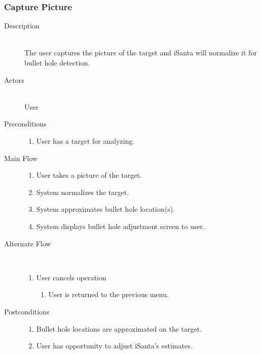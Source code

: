 \subsubsection{Capture Picture}
\begin{description}
    \item[Description] \hfill \\
        The user captures the picture of the target and iSanta will normalize it for bullet hole detection.
    \item[Actors] \hfill \\
        User
    \item[Preconditions] \hfill 
        \begin{enumerate}
            \item User has a target for analyzing.
        \end{enumerate}
    \item[Main Flow] \hfill 
        \begin{enumerate}
            \item User takes a picture of the target.
            \item System normalizes the target.
            \item System approximates bullet hole location(s).
            \item System displays bullet hole adjustment screen to user.
        \end{enumerate}
    \item[Alternate Flow] \hfill \\
        \begin{enumerate}
        	   \item User cancels operation
	   	\begin{enumerate}
			\item User is returned to the previous menu.
		\end{enumerate}
	\end{enumerate}
    \item[Postconditions]
        \begin{enumerate}
            \item Bullet hole locations are approximated on the target.
            \item User has opportunity to adjust iSanta's estimates.
        \end{enumerate} 
\end{description}
\myspace

